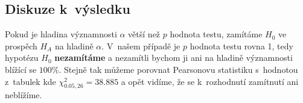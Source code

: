 \documentclass[11pt]{article}
\begin{document}
\subsection*{Diskuze k~výsledku}\label{diskuze-k-vuxfdsledku}

Pokud je hladina významnosti \(\alpha\) větší než \(p\) hodnota testu,
zamítáme \(H_0\) ve prospěch \(H_A\) na hladině \(\alpha\). V~našem
případě je \(p\) hodnota testu rovna 1, tedy hypotézu \(H_0\)
\textbf{nezamítáme} a nezamítli bychom ji ani na hladině významnosti
blížící se \(100\%\). Stejně tak můžeme porovnat Pearsonovu statistiku
s~hodnotou z~tabulek kde \(\chi^2_{0.05,26} = 38.885\) a opět vidíme, že
se k~rozhodnutí zamítnutí ani neblížíme.


    
    
    
    
\end{document}
